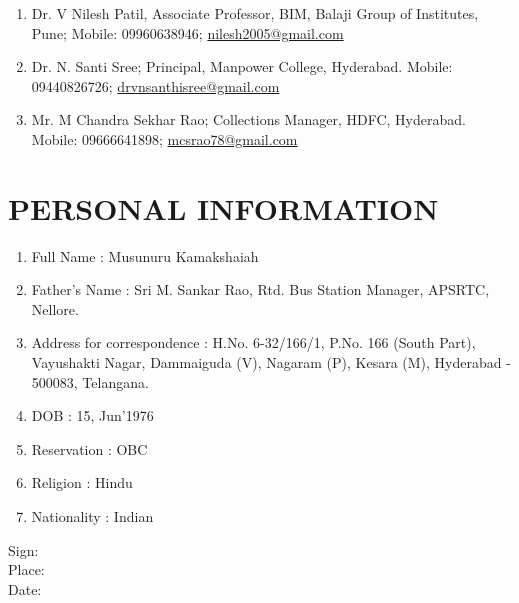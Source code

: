 \documentclass[10pt]{article}
\begin{document}
\begin{enumerate} \item Dr. V Nilesh Patil, Associate Professor, BIM, Balaji Group of Institutes, Pune; Mobile:  09960638946; \href{mailto:nilesh2005@gmail.com}{nilesh2005@gmail.com}

\item Dr. N. Santi Sree;  Principal, Manpower College, Hyderabad. Mobile: 09440826726; \href{mailto:drvnsanthisree@gmail.com}{drvnsanthisree@gmail.com}

\item Mr. M Chandra Sekhar Rao; Collections Manager, HDFC, Hyderabad. Mobile: 09666641898; \href{mailto:mcsrao78@gmail.com}{mcsrao78@gmail.com} \end{enumerate} 


\section{PERSONAL INFORMATION} \hline \vspace{0.5cm}

\small
\begin{enumerate} 
\item Full Name  :  Musunuru Kamakshaiah 
\item Father’s Name  :  Sri M. Sankar Rao, Rtd. Bus Station Manager, APSRTC, Nellore.
\item Address for correspondence :  H.No. 6-32/166/1, P.No. 166 (South Part), Vayushakti Nagar, Dammaiguda (V), Nagaram (P), Kesara (M), Hyderabad - 500083, Telangana. 

\item DOB  :  15, Jun’1976
\item Reservation  :  OBC
\item Religion  :  Hindu 
\item Nationality  :  Indian 
\end{enumerate}


\vspace{1cm}

Sign: \\
Place: \\
Date: 
\end{document}
